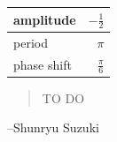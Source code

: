 \documentclass{exam}
\begin{document}
\begin{description}
        \begin{tabular}[H]{lr}
          \toprule
          amplitude & $- \frac{1}{2}$ \\
          \midrule
          period & $\pi$ \\
          \midrule
          phase shift & $\frac{\pi}{6}$ \\
          \bottomrule
        \end{tabular}

    \end{description}
  \else
    \vspace{1 cm}
    \begin{quote}
      \begin{em}
        TO DO
      \end{em}
    \end{quote}
    \hspace{1 cm} --Shunryu Suzuki
  \fi
\end{document}
